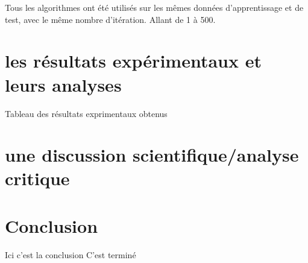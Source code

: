 \documentclass{article}
\begin{document}
Tous les algorithmes ont été utilisés sur les mêmes données d'apprentissage et de test, avec le même nombre d'itération. Allant de 1 à 500.





\section{les résultats expérimentaux et leurs analyses}
Tableau des résultats exprimentaux obtenus

\section{une discussion scientifique/analyse critique}

\section{Conclusion}
Ici c'est la conclusion 
C'est terminé



\end{document}
